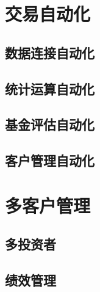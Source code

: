 \documentclass[]{book}
\theoremstyle{definition}
\theoremstyle{definition}
\theoremstyle{definition}
\theoremstyle{remark}
\begin{document}
\section{交易自动化}

\subsection{数据连接自动化}

\subsection{统计运算自动化}

\subsection{基金评估自动化}

\subsection{客户管理自动化}

\section{多客户管理}

\subsection{多投资者}

\subsection{绩效管理}

\hypertarget{section-4}{%
\section{}\label{section-4}}
\end{document}
